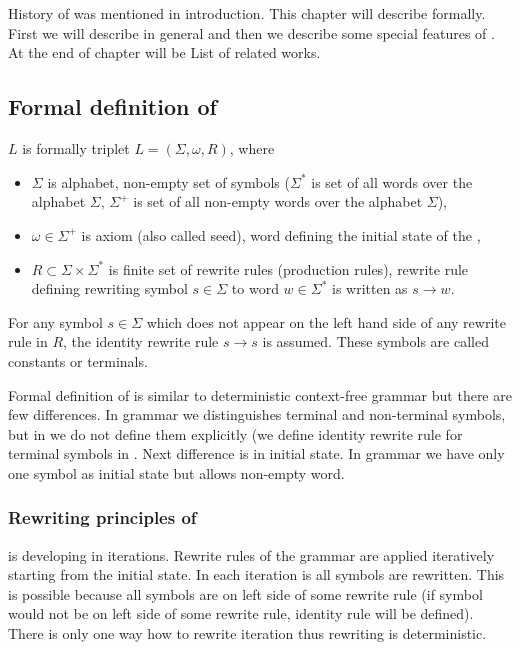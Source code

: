 
\chapter{\lsystem}

History of \lsystem was mentioned in introduction.
This chapter will describe \lsystem formally.
First we will describe \lsystem in general and then we describe some special features of \lsystem.
At the end of chapter will be List of related works.


\section{Formal definition of \lsystem}

\lsystem $L$ is formally triplet $L = (\Sigma, \omega, R)$, where

\begin{itemize}
	\item $\Sigma$ is alphabet, non-empty set of symbols ($\Sigma^{*}$ is set of all words over the alphabet $\Sigma$, $\Sigma^{+}$ is set of all non-empty words over the alphabet $\Sigma$),
	\item $\omega \in \Sigma^{+}$ is axiom (also called seed), word defining the initial state of the \lsystem,
	\item $R \subset \Sigma \times \Sigma^{*}$ is finite set of rewrite rules (production rules), rewrite rule defining rewriting symbol $s \in \Sigma$ to word $w \in \Sigma^{*}$ is written as $s \rightarrow w$.
\end{itemize}

For any symbol $s \in \Sigma$ which does not appear on the left hand side of any rewrite rule in $R$, the identity rewrite rule $s \rightarrow s$ is assumed.
These symbols are called constants or terminals.

Formal definition of \lsystem is similar to deterministic context-free grammar but there are few differences.
In grammar we distinguishes terminal and non-terminal symbols, but in \lsystems we do not define them explicitly (we define identity rewrite rule for terminal symbols in \lsystems.
Next difference is in initial state.
In grammar we have only one symbol as initial state but \lsystem allows non-empty word.


\subsection{Rewriting principles of \lsystem}

\lsystem is developing in iterations.
Rewrite rules of the \lsystem grammar are applied iteratively starting from the initial state.
In each iteration is all symbols are rewritten.
This is possible because all symbols are on left side of some rewrite rule (if symbol would not be on left side of some rewrite rule, identity rule will be defined).
There is only one way how to rewrite iteration thus rewriting is deterministic.


